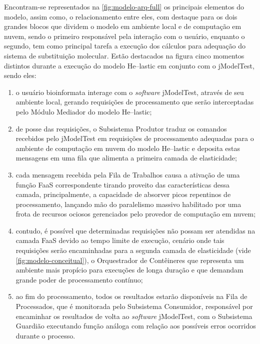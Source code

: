 \documentclass[english,brazilian]{UNISINOSmonografia} %
\begin{document}
Encontram-se representados na \autoref{fig:modelo-arq-full} os principais elementos do modelo, assim como, o relacionamento entre eles, com destaque para os dois grandes blocos que dividem o modelo em ambiente local e de computação em nuvem, sendo o primeiro responsável pela interação com o usuário, enquanto o segundo, tem como principal tarefa a execução dos cálculos para adequação do sistema de substituição molecular.
Estão destacados na figura cinco momentos distintos durante a execução do modelo \textsf{He}--lastic em conjunto com o jModelTest, sendo eles: 
\begin{enumerate}[label={\arabic*)}]

	\item o usuário bioinformata interage com o \textit{software} jModelTest, através de seu ambiente local, gerando requisições de processamento que serão interceptadas pelo Módulo Mediador do modelo \textsf{He}--lastic;

	\item de posse das requisições, o Subsistema Produtor traduz os comandos recebidos pelo jModelTest em requisições de processamento adequadas para o ambiente de computação em nuvem do modelo \textsf{He}--lastic e deposita estas mensagens em uma fila que alimenta a primeira camada de elasticidade;
	
	\item cada mensagem recebida pela Fila de Trabalhos causa a ativação de uma função FaaS correspondente tirando proveito das características dessa camada, principalmente, a capacidade de absorver picos repentinos de processamento, lançando mão do paralelismo massivo habilitado por uma frota de recursos ociosos gerenciados pelo provedor de computação em nuvem;
	
	\item contudo, é possível que determinadas requisições não possam ser atendidas na camada FaaS devido ao tempo limite de execução, cenário onde tais requisições serão encaminhadas para a segunda camada de elasticidade (vide \autoref{fig:modelo-conceitual}), o Orquestrador de Contêineres que representa um ambiente mais propício para execuções de longa duração e que demandam grande poder de processamento contínuo;
	
	\item ao fim do processamento, todos os resultados estarão disponíveis na Fila de Processados, que é monitorada pelo Subsistema Consumidor, responsável por encaminhar os resultados de volta ao \textit{software} jModelTest, com o Subsistema Guardião executando função análoga com relação aos possíveis erros ocorridos durante o processo.
\end{enumerate}
\end{document}
